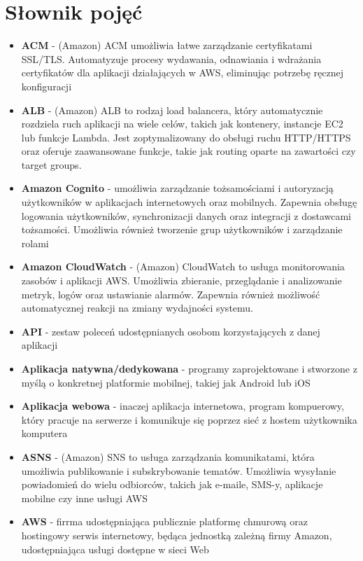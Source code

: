 \documentclass[../main.tex]{subfiles}
\begin{document}
    \section{Słownik pojęć}
    \begin{itemize}
        \item \textbf{ACM} - (Amazon) ACM umożliwia łatwe zarządzanie certyfikatami SSL/TLS. Automatyzuje procesy wydawania, odnawiania i wdrażania certyfikatów dla aplikacji działających w AWS, eliminując potrzebę ręcznej konfiguracji
        \item \textbf{ALB} - (Amazon) ALB to rodzaj load balancera, który automatycznie rozdziela ruch aplikacji na wiele celów, takich jak kontenery, instancje EC2 lub funkcje Lambda. Jest zoptymalizowany do obsługi ruchu HTTP/HTTPS oraz oferuje zaawansowane funkcje, takie jak routing oparte na zawartości czy target groups.
        \item \textbf{Amazon Cognito} - umożliwia zarządzanie tożsamościami i autoryzacją użytkowników w aplikacjach internetowych oraz mobilnych. Zapewnia obsługę logowania użytkowników, synchronizacji danych oraz integracji z dostawcami tożsamości. Umożliwia również tworzenie grup użytkowników i zarządzanie rolami
        \item \textbf{Amazon CloudWatch} - (Amazon) CloudWatch to usługa monitorowania zasobów i aplikacji AWS. Umożliwia zbieranie, przeglądanie i analizowanie metryk, logów oraz ustawianie alarmów. Zapewnia również możliwość automatycznej reakcji na zmiany wydajności systemu.
        \item \textbf{API} - zestaw poleceń udostępnianych osobom korzystających z danej aplikacji
        \item \textbf{Aplikacja natywna/dedykowana} - programy zaprojektowane i stworzone z myślą o konkretnej platformie mobilnej, takiej jak Android lub iOS
        \item \textbf{Aplikacja webowa} - inaczej aplikacja internetowa, program kompuerowy, który pracuje na serwerze i komunikuje się poprzez sieć z hostem użytkownika komputera
        \item \textbf{ASNS} - (Amazon) SNS to usługa zarządzania komunikatami, która umożliwia publikowanie i subskrybowanie tematów. Umożliwia wysyłanie powiadomień do wielu odbiorców, takich jak e-maile, SMS-y, aplikacje mobilne czy inne usługi AWS
        \item \textbf{AWS} - firrma udostępniająca publicznie platformę chmurową oraz hostingowy serwis internetowy, będąca jednostką zależną firmy Amazon, udostępniająca usługi dostępne w sieci Web

\end{itemize}
\end{document}

